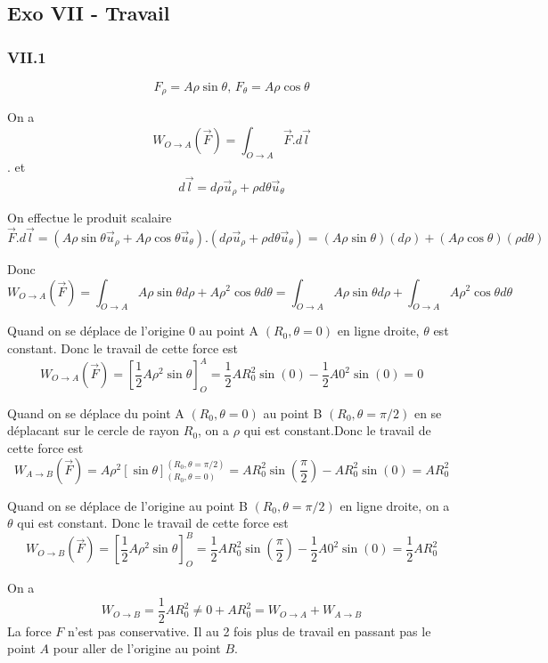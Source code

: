 \documentclass[]{book}
\theoremstyle{definition}
\begin{document}
\subsection*{Exo VII - Travail}
\subsubsection*{VII.1}
$$F_{\rho} = A \rho \sin \theta,\, F_{\theta} = A \rho \cos \theta$$

On a 
$$W_{O \to A}(\vec{F}) = \int_{O \to A} \vec{F}.d\vec{l}$$.
et
$$d\vec{l} = d\rho\vec{u}_{\rho} + \rho d\theta\vec{u}_{\theta}$$

On effectue le produit scalaire
$$\vec{F}.d\vec{l} = (A \rho \sin \theta\vec{u}_{\rho} + A \rho \cos \theta\vec{u}_{\theta}).(d\rho\vec{u}_{\rho} + \rho d\theta\vec{u}_{\theta}) = (A \rho \sin \theta) (d\rho) + (A \rho \cos \theta)(\rho d\theta)$$

Donc 
$$W_{O \to A}(\vec{F}) = \int_{O \to A} {A \rho \sin \theta d\rho + A \rho^2 \cos \theta d\theta} = \int_{O \to A} {A \rho \sin \theta d\rho} + \int_{O \to A} {A \rho^2 \cos \theta d\theta}$$

Quand on se d\'eplace de l'origine 0 au point A $(R_0,\theta = 0)$ en ligne droite, $\theta$ est constant. Donc le travail de cette force est
$$W_{O \to A}(\vec{F})=\left[ \frac{1}{2}A\rho^2 \sin \theta \right]_{O}^{A} = \frac{1}{2}AR_0^2\sin(0) - \frac{1}{2}A0^2\sin(0) = 0$$

Quand on se d\'eplace du point A $(R_0,\theta = 0)$ au point B $(R_0, \theta=\pi/2)$ en se d\'eplacant sur le cercle de rayon $R_0$, on a $\rho$ qui est constant.Donc le travail de cette force est
$$W_{A \to B}(\vec{F})= A\rho^2\left[\sin \theta \right]_{(R_0,\theta=0)}^{(R_0,\theta=\pi/2)} = AR_0^2\sin(\frac{\pi}{2}) - AR_0^2\sin(0) = AR_0^2$$

Quand on se d\'eplace de l'origine au point B $(R_0, \theta=\pi/2)$ en ligne droite, on a $\theta$ qui est constant. Donc le travail de cette force est
$$W_{O \to B}(\vec{F})=\left[ \frac{1}{2}A\rho^2 \sin \theta \right]_{O}^{B} = \frac{1}{2}AR_0^2\sin(\frac{\pi}{2}) - \frac{1}{2}A0^2\sin(0) = \frac{1}{2}AR_0^2$$

On a 
$$W_{O \to B} = \frac{1}{2}AR_0^2 \neq 0 + AR_0^2 = W_{O \to A} + W_{A \to B}$$
La force $F$ n'est pas conservative. Il au 2 fois plus de travail en passant pas le point $A$ pour aller de l'origine au point $B$.
\end{document}
